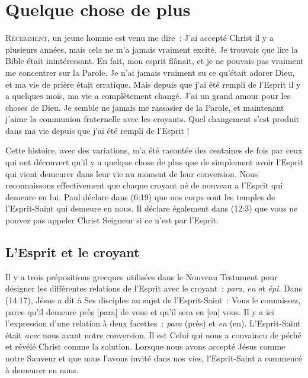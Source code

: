 \chapter{Quelque chose de plus}

\lettrine{R}{écemment}, un jeune homme est venu me dire~:
 \og J'ai accepté Christ il y a plusieurs années,
 mais cela ne m'a jamais vraiment excité.
 Je trouvais que lire la Bible était inintéressant.
 En fait, mon esprit flânait, et je ne pouvais pas vraiment me concentrer
 sur la Parole. Je n'ai jamais vraiment su ce qu'était adorer Dieu,
 et ma vie de prière était erratique. Mais depuis que j'ai été rempli
 de l'Esprit il y a quelques mois, ma vie a complètement changé.
 J'ai un grand amour pour les choses de Dieu.
 Je semble ne jamais me rassasier de la Parole, et maintenant j'aime
 la communion fraternelle avec les croyants.
 Quel changement s'est produit dans ma vie depuis que j'ai été rempli
 de l'Esprit ! \fg{}

Cette histoire, avec des variations, m'a été racontée des centaines de fois
 par ceux qui ont découvert qu'il y a quelque chose de plus que de simplement
 avoir l'Esprit qui vient demeurer dans leur vie au moment de leur conversion.
 Nous reconnaissons effectivement que chaque croyant né de nouveau a l'Esprit
 qui demeure en lui. Paul déclare dans (6:19) que nos corps
 sont les temples de l'Esprit-Saint qui demeure en nous.
 Il déclare également dans (12:3) que vous ne pouvez pas
 appeler Christ Seigneur si ce n'est par l'Esprit.


\section{L'Esprit et le croyant}

Il y a trois prépositions grecques utilisées dans le Nouveau Testament
 pour désigner les différentes relations de l'Esprit avec le croyant~:
 \emph{para}, \emph{en} et \emph{épi}.
 Dans (14:17), Jésus a dit à Ses disciples au sujet de
 l'Esprit-Saint~: \og Vous le connaissez, parce qu'il demeure près [para]
 de vous et qu'il sera en [en] vous. \fg{}
 Il y a ici l'expression d'une relation à deux facettes~:
 \emph{para} (près) et \emph{en} (en).
 L'Esprit-Saint était \emph{avec} nous avant notre conversion.
 Il est Celui qui nous a con\-vain\-cu de péché et révélé Christ
 comme la solution. Lorsque nous avons accepté Jésus comme notre Sauveur
 et que nous l'avons invité dans nos vies, l'Esprit-Saint
 a commencé à demeurer en nous.

